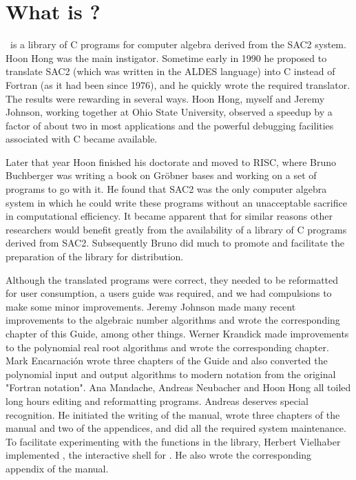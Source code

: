 \section{What is \saclib?}
\label{c:I s:W}

\saclib\ is a library of C programs for computer algebra derived
from the SAC2 system.  Hoon Hong was the main instigator.  Sometime early in
1990 he proposed to translate SAC2 (which was written in the ALDES language)
into C instead of Fortran (as it had been since 1976), and he quickly wrote
the required translator.  The results were rewarding in several ways.  Hoon
Hong, myself and Jeremy Johnson, working together at Ohio State University,
observed a speedup by a factor of about two in most applications and the
powerful debugging facilities associated with C became available.

Later that year Hoon finished his doctorate and moved to RISC, where Bruno
Buchberger was writing a book on Gr\"{o}bner bases and working on a set of
programs to go with it.  He found that SAC2 was the only computer algebra
system in which he could write these programs without an unacceptable
sacrifice in computational efficiency.  It became apparent that for similar
reasons other researchers would benefit greatly from the availability of a
library of C programs derived from SAC2.  Subsequently Bruno did much to
promote and facilitate the preparation of the library for distribution.

Although the translated programs were correct, they needed to be reformatted
for user consumption, a users guide was required, and we had compulsions to
make some minor improvements.  Jeremy Johnson made many recent improvements to
the algebraic number algorithms and wrote the corresponding chapter of this
Guide, among other things.  Werner Krandick made improvements to the
polynomial real root algorithms and wrote the corresponding chapter.  Mark
Encarnaci\'{o}n wrote three chapters of the Guide and also converted the
polynomial input and output algorithms to modern notation from the original
"Fortran notation".  Ana Mandache, Andreas Neubacher and Hoon Hong all toiled
long hours editing and reformatting programs.  Andreas deserves special
recognition.  He initiated the writing of the manual, wrote three chapters of
the manual and two of the appendices, and did all the required system
maintenance. To facilitate experimenting with the functions in the library,
Herbert Vielhaber implemented \isac, the interactive shell for \saclib. He
also wrote the corresponding appendix of the manual.

